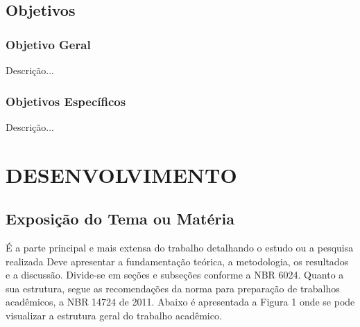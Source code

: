 \documentclass[12pt, openright, oneside, a4paper, brazil]{abntex2}
\begin{document}
\section{Objetivos}

\subsection{Objetivo Geral}
	
Descrição...

\subsection{Objetivos Específicos} 

Descrição...

% 
%
\cleardoublepage

\chapter{DESENVOLVIMENTO}

\section{Exposição do Tema ou Matéria}

É a parte principal e mais extensa do trabalho detalhando o estudo ou a pesquisa realizada Deve apresentar a fundamentação teórica, a metodologia, os resultados e a discussão. Divide-se em seções e subseções conforme a NBR 6024. Quanto a sua estrutura, segue as recomendações da norma para preparação de trabalhos acadêmicos, a NBR 14724 de 2011. \cite{ABNT} 
Abaixo é apresentada a Figura 1 onde se pode visualizar a estrutura geral do trabalho acadêmico.
\end{document}
